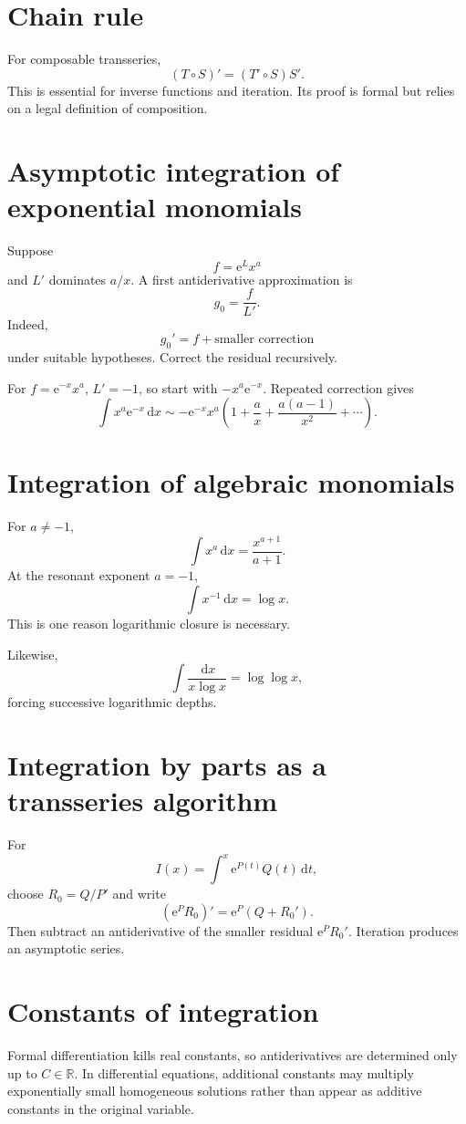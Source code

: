 \documentclass[11pt,oneside,openany]{book}
\newcommand{\R}{\mathbb{R}}
\newcommand{\e}{\mathrm{e}}
\newcommand{\dd}{\,\mathrm{d}}
\newcommand{\compose}{\mathbin{\circ}}
\theoremstyle{plain}
\theoremstyle{definition}
\theoremstyle{remark}
\begin{document}
\section{Chain rule}
For composable transseries,
\[
  (T\compose S)'=(T'\compose S)S'.
\]
This is essential for inverse functions and iteration. Its proof is formal but relies on a legal definition of composition.

\section{Asymptotic integration of exponential monomials}
Suppose
\[
  f=\e^{L}x^a
\]
and $L'$ dominates $a/x$. A first antiderivative approximation is
\[
  g_0=\frac{f}{L'}.
\]
Indeed,
\[
  g_0'=f+\text{smaller correction}
\]
under suitable hypotheses. Correct the residual recursively.

For $f=\e^{-x}x^a$, $L'=-1$, so start with $-x^a\e^{-x}$. Repeated correction gives
\[
  \int x^a\e^{-x}\dd x
  \sim-\e^{-x}x^a
  \left(1+\frac a x+\frac{a(a-1)}{x^2}+\cdots\right).
\]

\section{Integration of algebraic monomials}
For $a\ne-1$,
\[
  \int x^a\dd x=\frac{x^{a+1}}{a+1}.
\]
At the resonant exponent $a=-1$,
\[
  \int x^{-1}\dd x=\log x.
\]
This is one reason logarithmic closure is necessary.

Likewise,
\[
  \int\frac{\dd x}{x\log x}=\log\log x,
\]
forcing successive logarithmic depths.

\section{Integration by parts as a transseries algorithm}
For
\[
  I(x)=\int^x\e^{P(t)}Q(t)\dd t,
\]
choose $R_0=Q/P'$ and write
\[
  (\e^PR_0)'=\e^P(Q+R_0').
\]
Then subtract an antiderivative of the smaller residual $\e^PR_0'$. Iteration produces an asymptotic series.

\section{Constants of integration}
Formal differentiation kills real constants, so antiderivatives are determined only up to $C\in\R$. In differential equations, additional constants may multiply exponentially small homogeneous solutions rather than appear as additive constants in the original variable.
\end{document}
